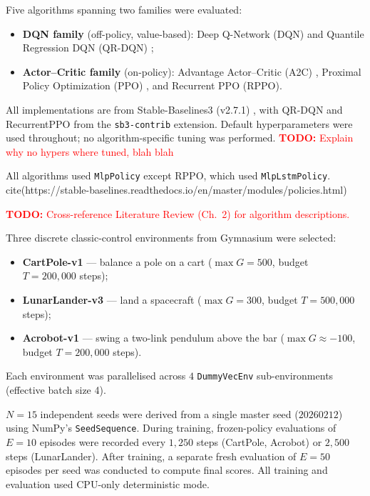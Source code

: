 Five algorithms spanning two families were evaluated:
\begin{itemize}
  \item \textbf{DQN family} (off-policy, value-based):
        Deep Q-Network (\textsc{DQN}) \citep{mnih2015human} and
        Quantile Regression DQN (\textsc{QR-DQN}) \citep{dabney2018qrdqn};
  \item \textbf{Actor--Critic family} (on-policy):
        Advantage Actor--Critic (\textsc{A2C}) \citep{mnih2016a3c},
        Proximal Policy Optimization (\textsc{PPO}) \citep{schulman2017ppo}, and
        Recurrent PPO (\textsc{RPPO}).
\end{itemize}
All implementations are from Stable-Baselines3 (v2.7.1) \citep{raffin2021sb3},
with QR-DQN and RecurrentPPO from the \texttt{sb3-contrib} extension.
Default hyperparameters were used throughout; no algorithm-specific tuning
was performed.
\textcolor{red}{\textbf{TODO:} Explain why no hypers where tuned, blah blah}

All algorithms used \texttt{MlpPolicy} except RPPO, which
used \texttt{MlpLstmPolicy}. cite(https://stable-baselines.readthedocs.io/en/master/modules/policies.html)

\textcolor{red}{\textbf{TODO:} Cross-reference Literature Review (Ch.\ 2) for algorithm descriptions.}

Three discrete classic-control environments from Gymnasium were selected:
\begin{itemize}
  \item \textbf{CartPole-v1} --- balance a pole on a cart
        ($\max G = 500$, budget $T = 200{,}000$ steps);
  \item \textbf{LunarLander-v3} --- land a spacecraft
        ($\max G = 300$, budget $T = 500{,}000$ steps);
  \item \textbf{Acrobot-v1} --- swing a two-link pendulum above the bar
        ($\max G \approx -100$, budget $T = 200{,}000$ steps).
\end{itemize}
Each environment was parallelised across $4$ \texttt{DummyVecEnv}
sub-environments (effective batch size 4).

$N = 15$ independent seeds were derived from a single master seed
($20260212$) using NumPy's \texttt{SeedSequence}. During training,
frozen-policy evaluations of $E = 10$ episodes were recorded every
$1{,}250$ steps (CartPole, Acrobot) or $2{,}500$ steps (LunarLander).
After training, a separate fresh evaluation of $E = 50$ episodes per seed
was conducted to compute final scores. All training and evaluation used
CPU-only deterministic mode.

